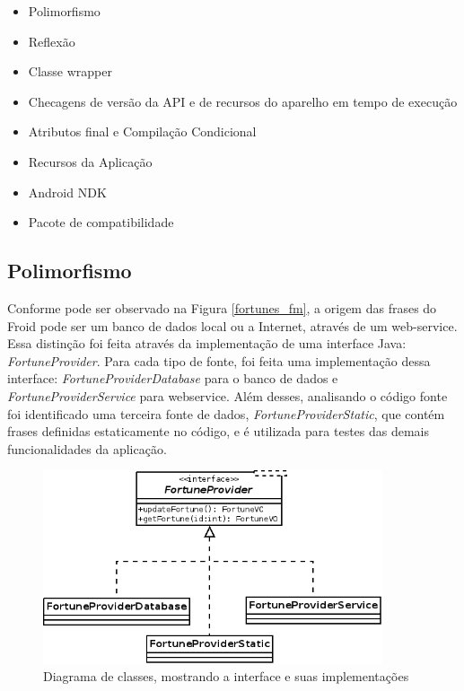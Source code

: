 \begin{itemize}
    \item Polimorfismo
    \item Reflexão
    \item Classe wrapper
    \item Checagens de versão da API e de recursos do aparelho em tempo de execução
    \item Atributos final e Compilação Condicional 
    \item Recursos da Aplicação
    \item Android NDK
    \item Pacote de compatibilidade
\end{itemize}

\subsection{Polimorfismo}

Conforme pode ser observado na Figura \ref{fortunes_fm}, a origem das frases do 
Froid pode ser um banco de dados local ou a Internet, através de um web-service.
Essa distinção foi feita através da implementação de uma interface Java: 
{\it FortuneProvider}.
Para cada tipo de fonte, foi feita uma implementação dessa interface: 
{\it FortuneProviderDatabase} para o banco de dados e {\it FortuneProviderService} para webservice. 
Além desses, analisando o código fonte foi identificado uma terceira fonte de dados, 
{\it FortuneProviderStatic}, que contém frases definidas estaticamente no código, e é 
utilizada para testes das demais funcionalidades da aplicação.

\begin{figure}[h]
    \centering
    \includegraphics[width=10cm]{img/implementacao_FortuneProvider}
    \caption{Diagrama de classes, mostrando a interface e suas implementações}
    \label{diagrama_classes}
\end{figure}

